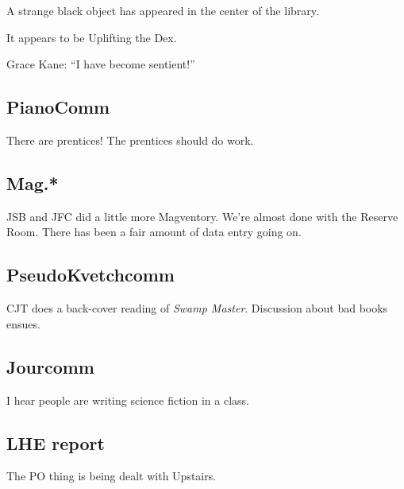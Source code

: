 \documentclass[10pt]{article}
\begin{document}
A strange black object has appeared in the center of the library.

It appears to be Uplifting the Dex.

Grace Kane: ``I have become sentient!''

\subsection*{PianoComm}

There are prentices!  The prentices should do work.

\subsection*{Mag.*}

JSB and JFC did a little more Magventory.  We're almost done with the Reserve Room.  There has been a fair amount of data entry going on.

\subsection*{PseudoKvetchcomm}

CJT does a back-cover reading of \emph{Swamp Master}.  Discussion about bad books ensues.

\subsection*{Jourcomm}

I hear people are writing science fiction in a class.


\subsection*{LHE report}

The PO thing is being dealt with Upstairs.

\end{document}
